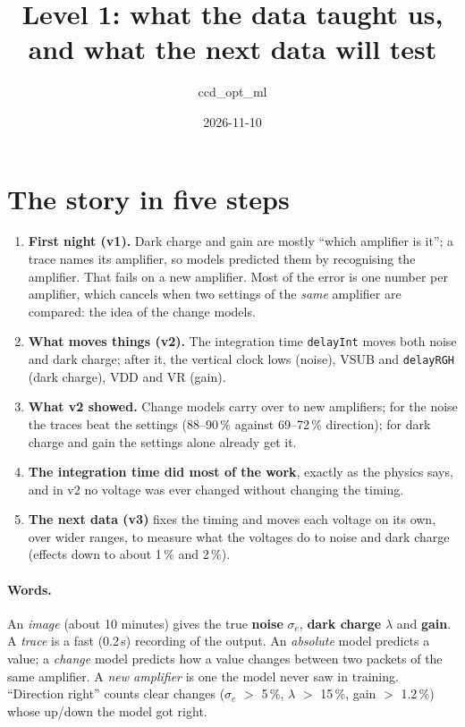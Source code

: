 \documentclass[11pt]{article}
\title{Level 1: what the data taught us, and what the next data will test}
\author{ccd\_opt\_ml}
\date{2026-11-10}
\begin{document}
\maketitle

\section*{The story in five steps}
\begin{enumerate}
\item \textbf{First night (v1).} Dark charge and gain are mostly ``which amplifier is it''; a trace names its amplifier, so
  models predicted them by recognising the amplifier. That fails on a new amplifier. Most of the error is one number per
  amplifier, which cancels when two settings of the \emph{same} amplifier are compared: the idea of the change models.
\item \textbf{What moves things (v2).} The integration time \texttt{delayInt} moves both noise and dark charge; after it,
  the vertical clock lows (noise), VSUB and \texttt{delayRGH} (dark charge), VDD and VR (gain).
\item \textbf{What v2 showed.} Change models carry over to new amplifiers; for the noise the traces beat the settings
  (88--90\,\% against 69--72\,\% direction); for dark charge and gain the settings alone already get it.
\item \textbf{The integration time did most of the work}, exactly as the physics says, and in v2 no voltage was ever
  changed without changing the timing.
\item \textbf{The next data (v3)} fixes the timing and moves each voltage on its own, over wider ranges, to measure what
  the voltages do to noise and dark charge (effects down to about 1\,\% and 2\,\%).
\end{enumerate}

\paragraph{Words.} An \emph{image} (about 10 minutes) gives the true \textbf{noise} $\sigma_e$, \textbf{dark charge}
$\lambda$ and \textbf{gain}. A \emph{trace} is a fast (0.2\,s) recording of the output. An \emph{absolute} model predicts
a value; a \emph{change} model predicts how a value changes between two packets of the same amplifier. A \emph{new
amplifier} is one the model never saw in training. ``Direction right'' counts clear changes ($\sigma_e$ $>$ 5\,\%,
$\lambda$ $>$ 15\,\%, gain $>$ 1.2\,\%) whose up/down the model got right.
\end{document}
